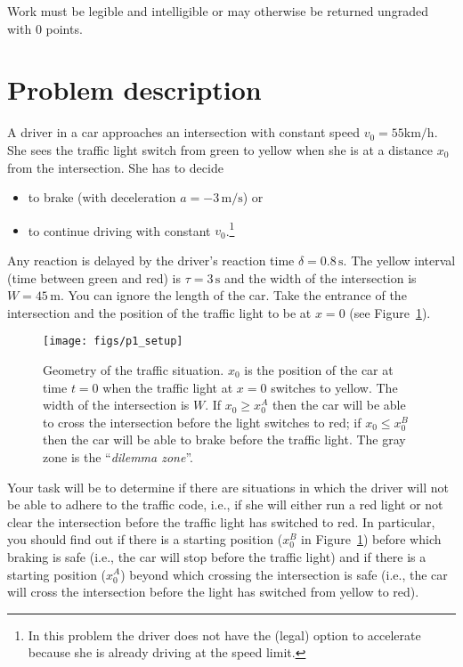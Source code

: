 \documentclass[letterpaper]{scrartcl}
\begin{document}
Work must be legible and intelligible or may otherwise be
returned ungraded with 0 points.

\section{Problem description}
\label{sec:problem}

A driver in a car approaches an intersection with constant speed
$v_0 = 55 \text{km/h}$. She sees the traffic light switch from green
to yellow when she is at a distance $x_0$ from the intersection. She
has to decide
\begin{itemize}
\item to brake (with deceleration $a = -3\,\text{m/s}$) or
\item to continue driving with constant $v_0$.\footnote{In this
    problem the driver does not have the (legal) option to accelerate
    because she is already driving at the speed limit.}
\end{itemize}
Any reaction is delayed by the driver's reaction time
$\delta = 0.8\,\text{s}$. The yellow interval (time between green and
red) is $\tau = 3\,\text{s}$ and the width of the intersection is
$W = 45\,\text{m}$. You can ignore the length of the car. Take the
entrance of the intersection and the position of the traffic light to
be at $x=0$ (see Figure~\ref{fig:setup}).

\begin{figure}[btp]
  \centering
  \texttt{[image: figs/p1\_setup]}
  \caption{Geometry of the traffic situation. $x_{0}$ is the position
    of the car at time $t=0$ when the traffic light at $x=0$ switches
    to yellow. The width of the intersection is $W$. If $x_{0} \ge
    x_{0}^{A}$ then the car will be able to cross the intersection
    before the light switches to red; if $x_{0} \le x_{0}^{B}$ then
    the car will be able to brake before the traffic light. The gray
    zone is the ``\emph{dilemma zone}''.}
  \label{fig:setup}
\end{figure}

Your task will be to determine if there are situations in which the
driver will not be able to adhere to the traffic code, i.e., if she
will either run a red light or not clear the intersection before the
traffic light has switched to red. In particular, you should find out
if there is a starting position ($x_{0}^{B}$ in
Figure~\ref{fig:setup}) before which braking is safe (i.e., the car
will stop before the traffic light) and if there is a starting
position ($x_{0}^{A}$) beyond which crossing the intersection is safe
(i.e., the car will cross the intersection before the light has
switched from yellow to red).
\end{document}
